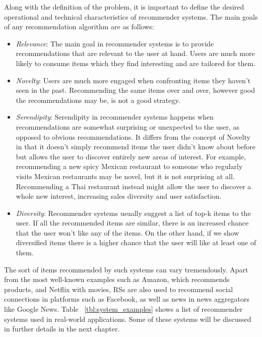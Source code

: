 \documentclass[cic,tc,english]{iiufrgs}
\begin{document}
Along with the definition of the problem, it is important to define the desired operational and technical characteristics of recommender systems. The main goals of any recommendation algorithm are as follows:
\begin{itemize}
\item \emph{Relevance}: The main goal in recommender systems is to provide recommendations that are relevant to the user at hand. Users are much more likely to consume items which they find interesting and are tailored for them.
\item \emph{Novelty}: Users are much more engaged when confronting items they haven't seen in the past. Recommending the same items over and over, however good the recommendations may be, is not a good strategy.
\item \emph{Serendipity}: Serendipity in recommender systems happens when recommendations are somewhat surprising or unexpected to the user, as opposed to obvious recommendations. It differs from the concept of Novelty in that it doesn't simply recommend items the user didn't know about before but allows the user to discover entirely new areas of interest. For example, recommending a new spicy Mexican restaurant to someone who regularly visits Mexican restaurants may be novel, but it is not surprising at all. Recommending a Thai restaurant instead might allow the user to discover a whole new interest, increasing sales diversity and user satisfaction.
\item \emph{Diversity}: Recommender systems usually suggest a list of top-k items to the user. If all the recommended items are similar, there is an increased chance that the user won't like any of the items. On the other hand, if we show diversified items there is a higher chance that the user will like at least one of them.
\end{itemize}

The sort of items recommended by such systems can vary tremendously. Apart from the most well-known examples such as Amazon, which recommends products, and Netflix with movies, RSs are also used to recommend social connections in platforms such as Facebook, as well as news in news aggregators like Google News. Table  ~\ref{tbl:system_examples} shows a list of recommender systems used in real-world applications. Some of these systems will be discussed in further details in the next chapter.
\end{document}
